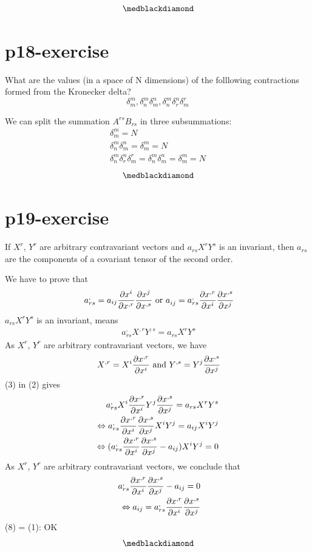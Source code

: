 $$\medblackdiamond$$
\pagebreak[4]

\section{p18-exercise}

\begin{tcolorbox}
What are the values (in a space of N dimensions) of the folllowing contractions formed from the Kronecker delta?
$$\delta^{m}_{m},  \delta^{m}_{n} \delta^{n}_{m},  \delta^{m}_{n} \delta^{n}_{r} \delta^{r}_{m}$$
\end{tcolorbox}
We can split the summation $A^{rs}B_{rs}$ in three subsummations:
\begin{align}
\delta^{m}_{m} = N\\
\delta^{m}_{n} \delta^{n}_{m} = \delta^{m}_{m} = N\\
\delta^{m}_{n} \delta^{n}_{r} \delta^{r}_{m} = \delta^{m}_{n} \delta^{n}_{m} = \delta^{m}_{m} = N
\end{align}
$$\medblackdiamond$$
\pagebreak[4]

\section{p19-exercise}
\begin{tcolorbox}
If $X^{r}$, $Y^{r}$ are arbitrary contravariant vectors and $a_{rs}X^{r}Y^{s}$ is an invariant, then $a_{rs}$ are the components of a covariant tensor of the second order. 
\end{tcolorbox}
We have to prove that
\begin{align}
\ a^{,}_{rs} = a_{ij}\pdv{x^{i}}{x^{,r}}\pdv{x^{j}}{x^{,s}} \text{ or } a^{}_{ij} = a^{,}_{rs}\pdv{x^{,r}}{x^{i}}\pdv{x^{,s}}{x^{j}}
\end{align}
$a_{rs}X^{r}Y^{s}$ is an invariant, means
\begin{align}
\ a^{,}_{rs}X^{,r}Y^{,s} = a_{rs}X^{r}Y^{s}
\end{align}
As $X^{r}$, $Y^{r}$ are arbitrary contravariant vectors, we have
\begin{align}
\ X^{,r} = X^{i}\pdv{x^{,r}}{x^{i}} \text{   and  } Y^{,s} = Y^{j}\pdv{x^{,s}}{x^{j}}
\end{align}
(3) in (2) gives
\begin{align}
\ a^{,}_{rs}X^{i}\pdv{x^{,r}}{x^{i}}Y^{j}\pdv{x^{,s}}{x^{j}} = a_{rs}X^{r}Y^{s}\\
\Leftrightarrow a^{,}_{rs}\pdv{x^{,r}}{x^{i}}\pdv{x^{,s}}{x^{j}}X^{i}Y^{j} = a_{ij}X^{i}Y^{j}\\
\Leftrightarrow (a^{,}_{rs}\pdv{x^{,r}}{x^{i}}\pdv{x^{,s}}{x^{j}} - a_{ij})X^{i}Y^{j} = 0
\end{align}
As $X^{r}$, $Y^{r}$ are arbitrary contravariant vectors, we conclude that 
\begin{align}
\ a^{,}_{rs}\pdv{x^{,r}}{x^{i}}\pdv{x^{,s}}{x^{j}} - a_{ij} = 0\\
\Leftrightarrow a_{ij} =  a^{,}_{rs}\pdv{x^{,r}}{x^{i}}\pdv{x^{,s}} {x^{j}}
\end{align}
(8) = (1): OK
$$\medblackdiamond$$
\pagebreak[4]

